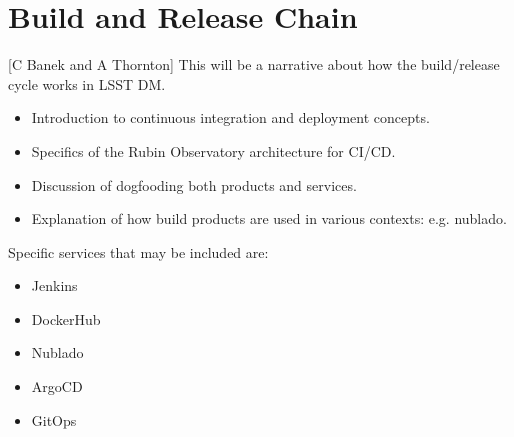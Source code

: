 \section{Build and Release Chain}[C Banek and A Thornton]
This will be a narrative about how the build/release cycle works in LSST DM.
\begin{itemize}
\item Introduction to continuous integration and deployment concepts.
\item Specifics of the Rubin Observatory architecture for CI/CD.
\item Discussion of dogfooding both products and services.
\item Explanation of how build products are used in various contexts: e.g. nublado.
\end{itemize}

Specific services that may be included are:
\begin{itemize}
\item Jenkins
\item DockerHub
\item Nublado
\item ArgoCD
\item GitOps
\end{itemize}
